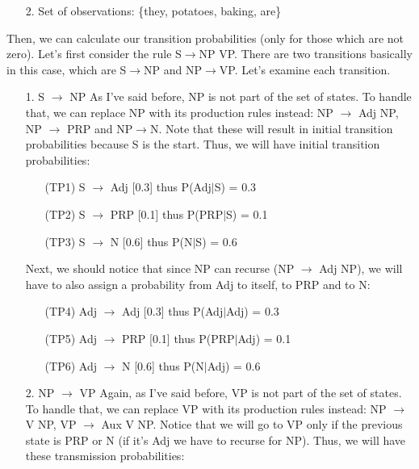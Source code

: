 \documentclass[twoside]{homework}
\begin{document}
\begin{itemize}
\begin{itemize}
        \item [2.] Set of observations: \{they, potatoes, baking, are\}
    \end{itemize}
    Then, we can calculate our transition probabilities (only for those which are not zero). Let's first consider the rule S$\xrightarrow{}$NP VP. There are two transitions basically in this case, which are S$\xrightarrow{}$NP and NP$\xrightarrow{}$VP. Let's examine each transition.
    \begin{itemize}
        \item [1.] S $\xrightarrow{}$ NP\newline
        As I've said before, NP is not part of the set of states. To handle that, we can replace NP with its production rules instead: NP $\xrightarrow{}$ Adj NP, NP $\xrightarrow{}$ PRP and NP$\xrightarrow{}$N. Note that these will result in initial transition probabilities because S is the start. Thus, we will have initial transition probabilities:
        \begin{itemize}
            \item [(TP1)] S $\xrightarrow{}$ Adj [0.3] thus P(Adj$|$S) = 0.3
            \item [(TP2)] S $\xrightarrow{}$ PRP [0.1] thus P(PRP$|$S) = 0.1
            \item [(TP3)] S $\xrightarrow{}$ N [0.6] thus P(N$|$S) = 0.6
        \end{itemize}
        Next, we should notice that since NP can recurse (NP $\xrightarrow{}$ Adj NP), we will have to also assign a probability from Adj to itself, to PRP and to N:
        \begin{itemize}
            \item [(TP4)] Adj $\xrightarrow{}$ Adj [0.3] thus P(Adj$|$Adj) = 0.3
            \item [(TP5)] Adj $\xrightarrow{}$ PRP [0.1] thus P(PRP$|$Adj) = 0.1
            \item [(TP6)] Adj $\xrightarrow{}$ N [0.6] thus P(N$|$Adj) = 0.6
        \end{itemize}
        \item [2.] NP $\xrightarrow{}$ VP\newline
        Again, as I've said before, VP is not part of the set of states. To handle that, we can replace VP with its production rules instead: NP $\xrightarrow{}$ V NP, VP $\xrightarrow{}$ Aux V NP. Notice that we will go to VP only if the previous state is PRP or N (if it's Adj we have to recurse for NP). Thus, we will have these transmission probabilities:

\end{itemize}
\end{itemize}
\end{document}

